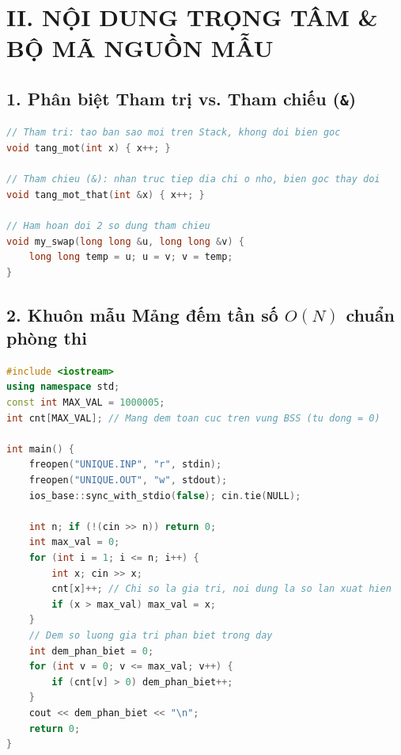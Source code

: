 \documentclass[11pt,a4paper]{article}
\begin{document}
\newpage
\section*{\color{AsianDarkBlue}II. NỘI DUNG TRỌNG TÂM \& BỘ MÃ NGUỒN MẪU}

\subsection*{\color{AsianBlue}1. Phân biệt Tham trị vs. Tham chiếu (\texttt{\&})}
\begin{lstlisting}[language=C++]
// Tham tri: tao ban sao moi tren Stack, khong doi bien goc
void tang_mot(int x) { x++; }

// Tham chieu (&): nhan truc tiep dia chi o nho, bien goc thay doi
void tang_mot_that(int &x) { x++; }

// Ham hoan doi 2 so dung tham chieu
void my_swap(long long &u, long long &v) {
    long long temp = u; u = v; v = temp;
}
\end{lstlisting}

\subsection*{\color{AsianBlue}2. Khuôn mẫu Mảng đếm tần số $O(N)$ chuẩn phòng thi}
\begin{lstlisting}[language=C++]
#include <iostream>
using namespace std;
const int MAX_VAL = 1000005;
int cnt[MAX_VAL]; // Mang dem toan cuc tren vung BSS (tu dong = 0)

int main() {
    freopen("UNIQUE.INP", "r", stdin);
    freopen("UNIQUE.OUT", "w", stdout);
    ios_base::sync_with_stdio(false); cin.tie(NULL);

    int n; if (!(cin >> n)) return 0;
    int max_val = 0;
    for (int i = 1; i <= n; i++) {
        int x; cin >> x;
        cnt[x]++; // Chi so la gia tri, noi dung la so lan xuat hien
        if (x > max_val) max_val = x;
    }
    // Dem so luong gia tri phan biet trong day
    int dem_phan_biet = 0;
    for (int v = 0; v <= max_val; v++) {
        if (cnt[v] > 0) dem_phan_biet++;
    }
    cout << dem_phan_biet << "\n";
    return 0;
}
\end{lstlisting}
\end{document}
